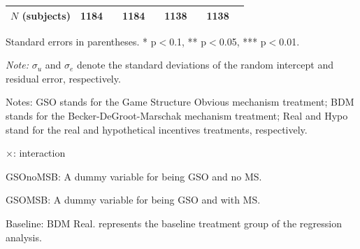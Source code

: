 \documentclass[12pt]{article}
\begin{document}
\begin{table}[H]
{\begin{tabular}{l*{4}{cc}}
\(N \) (subjects)      &        1184         &            &        1184         &            &        1138         &            &        1138         &            \\
\hline \hline
\end{tabular}
}




\begin{tablenotes}
            \footnotesize
            \item Standard errors in parentheses. * p$<$0.1, ** p$<$0.05, *** p$<$0.01.
            \item \textit{Note:} $\sigma_u$ and $\sigma_e$ denote the standard deviations of the random intercept and residual error, respectively.
            \item Notes: GSO stands for the Game Structure Obvious mechanism treatment; BDM stands for the Becker-DeGroot-Marschak mechanism treatment; Real and Hypo stand for the real and hypothetical incentives treatments, respectively.
           \item $\times$: interaction
           \item GSOnoMSB: A dummy variable for being GSO and no MS.
           \item GSOMSB: A dummy variable for being GSO and with MS.
           \item Baseline: BDM Real. represents the baseline treatment group of the regression analysis.
        \end{tablenotes}
            \end{table}








\clearpage


    \begin{table}[htbp!]
        \centering
        \caption{Two-Sample Test of Proportions (complexity above median)}
        \label{tab:Appendix_proportion_test}
    \end{table}
\end{document}
